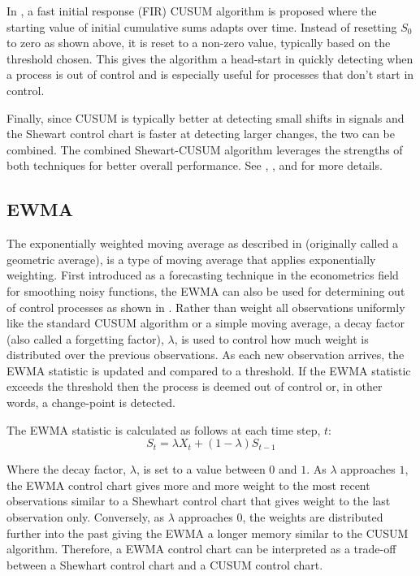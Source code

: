 In \cite{lucas1982fast}, a fast initial response (FIR) CUSUM algorithm is proposed where the starting value of initial cumulative sums adapts over time. Instead of resetting $S_0$ to zero as shown above, it is reset to a non-zero value, typically based on the threshold chosen. This gives the algorithm a head-start in quickly detecting when a process is out of control and is especially useful for processes that don't start in control.

Finally, since CUSUM is typically better at detecting small shifts in signals and the Shewart control chart is faster at detecting larger changes, the two can be combined. The combined Shewart-CUSUM algorithm leverages the strengths of both techniques for better overall performance. See \cite{lucas1982combined}, \cite{yashchin1985analysis}, and \cite{westgard1977combined} for more details. 

\subsection{EWMA}
The exponentially weighted moving average as described in \cite{roberts1959control} (originally called a geometric average), is a type of moving average that applies exponentially weighting. First introduced as a forecasting technique in the econometrics field for smoothing noisy functions, the EWMA can also be used for determining out of control processes as shown in \cite{hunter1986exponentially}. Rather than weight all observations uniformly like the standard CUSUM algorithm or a simple moving average, a decay factor (also called a  forgetting factor), $\lambda$, is used to control how much weight is distributed over the previous observations. As each new observation arrives, the EWMA statistic is updated and compared to a threshold. If the EWMA statistic exceeds the threshold then the process is deemed out of control or, in other words, a change-point is detected.

The EWMA statistic is calculated as follows at each time step, $t$:
$$S_t = \lambda X_t + (1-\lambda)S_{t-1} $$

Where the decay factor,  $\lambda$, is set to a value between $0$ and $1$. As $\lambda$ approaches $1$, the EWMA control chart gives more and more weight to the most recent observations similar to a Shewhart control chart that gives weight to the last observation only. Conversely, as $\lambda$ approaches $0$, the weights are distributed further into the past giving the EWMA a longer memory similar to the CUSUM algorithm. Therefore, a EWMA control chart can be interpreted as a trade-off between a Shewhart control chart and a CUSUM control chart. 

